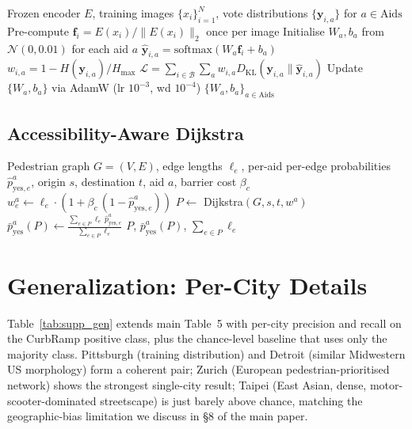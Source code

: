 \documentclass[conference]{IEEEtran}
\newcommand{\kl}{D_{\mathrm{KL}}}
\newcommand{\hmax}{H_{\max}}
\begin{document}
\begin{algorithm}[!t]
\caption{Soft-KL training of a per-aid linear probe}
\label{alg:softkl}
\begin{algorithmic}[1]
\REQUIRE Frozen encoder $E$, training images $\{x_i\}_{i=1}^N$, vote distributions $\{\mathbf{y}_{i,a}\}$ for $a \in \mathrm{Aids}$
\STATE Pre-compute $\mathbf{f}_i = E(x_i)/\|E(x_i)\|_2$ once per image
\STATE Initialise $W_a, b_a$ from $\mathcal{N}(0, 0.01)$ for each aid $a$
      \STATE $\hat{\mathbf{y}}_{i,a} = \mathrm{softmax}(W_a \mathbf{f}_i + b_a)$
      \STATE $w_{i,a} = 1 - H(\mathbf{y}_{i,a})/\hmax$
      \STATE $\mathcal{L} = \sum_{i \in \mathcal{B}}\sum_a w_{i,a} \kl(\mathbf{y}_{i,a}\|\hat{\mathbf{y}}_{i,a})$
      \STATE Update $\{W_a, b_a\}$ via AdamW (lr $10^{-3}$, wd $10^{-4}$)
   \ENDFOR
\ENDFOR
\RETURN $\{W_a, b_a\}_{a \in \mathrm{Aids}}$
\end{algorithmic}
\end{algorithm}

\subsection{Accessibility-Aware Dijkstra}

\begin{algorithm}[!t]
\caption{Per-aid accessibility-aware shortest path}
\label{alg:dijkstra}
\begin{algorithmic}[1]
\REQUIRE Pedestrian graph $G=(V,E)$, edge lengths $\ell_e$, per-aid per-edge probabilities $\hat{p}^a_{\mathrm{yes},e}$, origin $s$, destination $t$, aid $a$, barrier cost $\beta_c$
   \STATE $w_e^a \gets \ell_e \cdot (1 + \beta_c \,(1 - \hat{p}^a_{\mathrm{yes},e}))$
\ENDFOR
\STATE $P \gets$ Dijkstra$(G, s, t, w^a)$
\STATE $\bar{p}^a_{\mathrm{yes}}(P) \gets \frac{\sum_{e \in P} \ell_e \,\hat{p}^a_{\mathrm{yes},e}}{\sum_{e \in P} \ell_e}$
\RETURN $P$, $\bar{p}^a_{\mathrm{yes}}(P)$, $\sum_{e \in P} \ell_e$
\end{algorithmic}
\end{algorithm}

\FloatBarrier
\section{Generalization: Per-City Details}
\label{sec:supp_gen}

Table~\ref{tab:supp_gen} extends main Table~5 with per-city precision and recall on the CurbRamp positive class, plus the chance-level baseline that uses only the majority class. Pittsburgh (training distribution) and Detroit (similar Midwestern US morphology) form a coherent pair; Zurich (European pedestrian-prioritised network) shows the strongest single-city result; Taipei (East Asian, dense, motor-scooter-dominated streetscape) is just barely above chance, matching the geographic-bias limitation we discuss in \S8 of the main paper.
\end{document}

